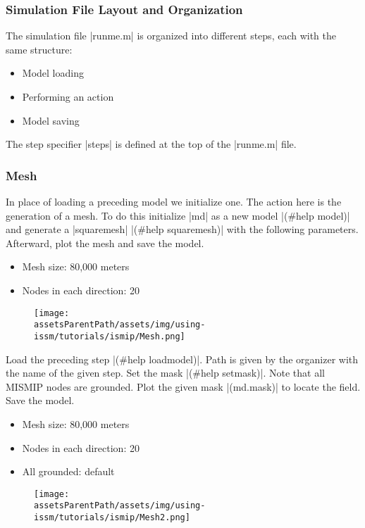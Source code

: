 \subsubsection{Simulation File Layout and Organization}  %
The simulation file \lstinlinebg|runme.m| is organized into different steps, each with the same structure:
\begin{itemize}
	\item Model loading
	\item Performing an action
	\item Model saving
\end{itemize}
The step specifier \lstinlinebg|steps| is defined at the top of the \lstinlinebg|runme.m| file.

\subsubsection{Mesh} %
In place of loading a preceding model we initialize one. The action here is the generation of a mesh. To do this initialize \lstinlinebg|md| as a new model \lstinlinebg|(#help model)| and generate a \lstinlinebg|squaremesh| \lstinlinebg|(#help squaremesh)| with the following parameters. Afterward, plot the mesh and save the model.
\begin{itemize}
	\item Mesh size: 80,000 meters
	\item Nodes in each direction: 20
\end{itemize}
\begin{figure}[H]
	\begin{center}
		\texttt{[image: \\assetsParentPath/assets/img/using-issm/tutorials/ismip/Mesh.png]}
	\end{center}
\end{figure}
Load the preceding step \lstinlinebg|(#help loadmodel)|. Path is given by the organizer with the name of the given step. Set the mask \lstinlinebg|(#help setmask)|. Note that all MISMIP nodes are grounded. Plot the given mask \lstinlinebg|(md.mask)| to locate the field. Save the model.
\begin{itemize}
	\item Mesh size: 80,000 meters
	\item Nodes in each direction: 20
	\item All grounded: default
\end{itemize}
\begin{figure}[H]
	\begin{center}
		\texttt{[image: \\assetsParentPath/assets/img/using-issm/tutorials/ismip/Mesh2.png]}
	\end{center}
\end{figure}
